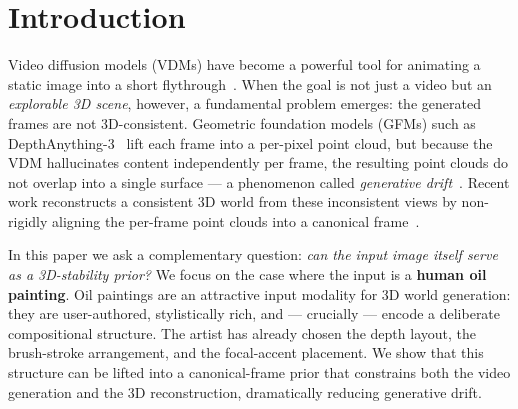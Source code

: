 \documentclass[10pt,twocolumn,letterpaper]{article}
\begin{document}
\section{Introduction}
\label{sec:intro}

Video diffusion models (VDMs) have become a powerful tool for animating a
static image into a short flythrough~\cite{wan2025,viewcrafter,gen3c,seva}.
When the goal is not just a video but an \emph{explorable 3D scene}, however,
a fundamental problem emerges: the generated frames are not 3D-consistent.
Geometric foundation models (GFMs) such as DepthAnything-3~\cite{da3} lift
each frame into a per-pixel point cloud, but because the VDM hallucinates
content independently per frame, the resulting point clouds do not overlap
into a single surface --- a phenomenon called \emph{generative
drift}~\cite{hoellein2026worldreconstruction}. Recent work reconstructs a
consistent 3D world from these inconsistent views by non-rigidly aligning the
per-frame point clouds into a canonical frame~\cite{hoellein2026worldreconstruction}.

In this paper we ask a complementary question: \emph{can the input image
itself serve as a 3D-stability prior?} We focus on the case where the input is
a \textbf{human oil painting}. Oil paintings are an attractive input modality
for 3D world generation: they are user-authored, stylistically rich, and ---
crucially --- encode a deliberate compositional structure. The artist has
already chosen the depth layout, the brush-stroke arrangement, and the
focal-accent placement. We show that this structure can be lifted into a
canonical-frame prior that constrains both the video generation and the 3D
reconstruction, dramatically reducing generative drift.
\end{document}
